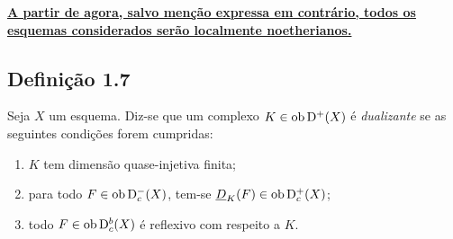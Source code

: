 \textbf{\uline{A partir de agora, salvo menção expressa em contrário, todos os esquemas considerados serão localmente noetherianos.}}

\subsection*{Definição 1.7}
Seja $X$ um esquema. Diz-se que um complexo $K \in \operatorname{ob} \mathrm{D}^{+}(X)$ é \emph{dualizante} se as seguintes condições forem cumpridas:
\begin{enumerate}[label=(\roman*)]
\item $K$ tem dimensão quase-injetiva finita;
\item para todo $F \in \operatorname{ob} \mathrm{D}_c^{-}(X)$, tem-se $\underline{D}_K(F) \in \operatorname{ob} \mathrm{D}_c^{+}(X)$;
\item todo $F \in \operatorname{ob} \mathrm{D}_c^{b}(X)$ é reflexivo com respeito a $K$.
\end{enumerate}
